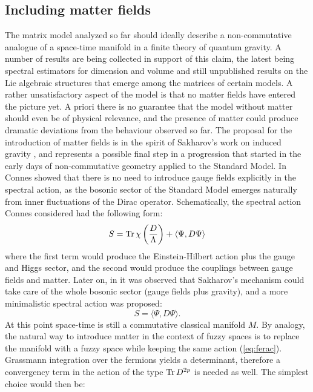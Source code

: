 \subsection{Including matter fields}
The matrix model analyzed so far should ideally describe a non-commutative analogue of a space-time manifold in a finite theory of quantum gravity. A number of results are being collected in support of this claim, the latest being spectral estimators for dimension and volume \cite{barrdruceglaser} and still unpublished results on the Lie algebraic structures that emerge among the matrices of certain models.\newline
A rather unsatisfactory aspect of the model is that no matter fields have entered the picture yet. A priori there is no guarantee that the model without matter should even be of physical relevance, and the presence of matter could produce dramatic deviations from the behaviour observed so far.\newline
The proposal for the introduction of matter fields is in the spirit of Sakharov's work on induced gravity \cite{sak}, and represents a possible final step in a progression that started in the early days of non-commutative geometry applied to the Standard Model. In \cite{connesGRAVMAT} Connes showed that there is no need to introduce gauge fields explicitly in the spectral action, as the bosonic sector of the Standard Model emerges naturally from inner fluctuations of the Dirac operator. Schematically, the spectral action Connes considered had the following form:
\begin{equation}
S = \operatorname{Tr} \chi \left( \frac{D}{\Lambda} \right) + \langle \Psi, D \Psi \rangle
\end{equation}
where the first term would produce the Einstein-Hilbert action plus the gauge and Higgs sector, and the second would produce the couplings between gauge fields and matter. Later on, in \cite{barrettIND} it was observed that Sakharov's mechanism could take care of the whole bosonic sector (gauge fields plus gravity), and a more minimalistic spectral action was proposed:
\begin{equation}\label{eq:ferac}
S = \langle \Psi, D \Psi \rangle.
\end{equation}
At this point space-time is still a commutative classical manifold $M$. By analogy, the natural way to introduce matter in the context of fuzzy spaces is to replace the manifold with a fuzzy space while keeping the same action (\ref{eq:ferac}). Grassmann integration over the fermions yields a determinant, therefore a convergency term in the action of the type $\operatorname{Tr} D^{2p}$ is needed as well. The simplest choice would then be:
